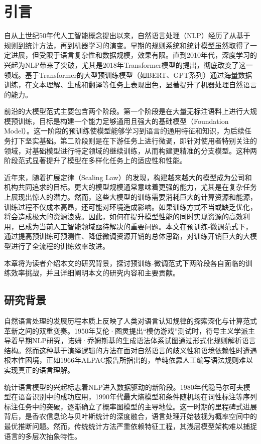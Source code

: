 
\chapter{引言}

自从上世纪50年代人工智能概念提出以来，自然语言处理（NLP）经历了从基于规则到统计方法，再到机器学习的演变。早期的规则系统和统计模型虽然取得了一定进展，但受限于语言复杂性和数据规模，效果有限。直到2010年代，深度学习的兴起为NLP带来了突破，尤其是2018年Transformer模型的提出，彻底改变了这一领域。基于Transformer的大型预训练模型（如BERT、GPT系列）通过海量数据训练，在文本理解、生成和翻译等任务上表现出色，显著提升了机器处理自然语言的能力。


前沿的大模型范式主要包含两个阶段。第一个阶段是在大量无标注语料上进行大规模预训练，目标是构建一个能力足够通用且强大的基础模型（Foundation Model）。这一阶段的预训练使模型能够学习到语言的通用特征和知识，为后续任务打下坚实基础。第二阶段则是在下游任务上进行微调，即针对使用者特别关注的领域，对基础模型进行特定领域的继续训练，从而构建更精准的分支模型。这种两阶段范式显著提升了模型在多样化任务上的适应性和性能。

近年来，随着扩展定律（Scaling Law）的发现，构建越来越大的模型成为公司和机构共同追求的目标。更大的模型规模通常意味着更强的能力，尤其是在复杂任务上展现出惊人的潜力。然而，这些大模型的训练需要消耗巨大的计算资源和能源，训练过程不仅成本高昂，还可能对环境造成影响。如果训练方式不当或缺乏优化，将会造成极大的资源浪费。因此，如何在提升模型性能的同时实现资源的高效利用，已成为当前人工智能领域亟待解决的重要问题。本文在预训练-微调范式下，通过提高预训练可预测性、降低微调资源开销的总体思路，对训练开销巨大的大模型进行了全流程的训练效率改进。

本章将为读者介绍本文的研究背景，探讨预训练-微调范式下两阶段各自面临的训练效率挑战，并且详细阐明本文的研究内容和主要贡献。


\section{研究背景}

自然语言处理的发展历程本质上反映了人类对语言认知规律的探索深化与计算范式革新之间的双重变奏。1950年艾伦·图灵提出“模仿游戏”测试时，符号主义学派主导着早期NLP研究，诺姆·乔姆斯基的生成语法体系试图通过形式化规则解析语言结构。然而这种基于演绎逻辑的方法在面对自然语言的歧义性和语境依赖性时遭遇根本性困境，正如1966年ALPAC报告所指出的，单纯依靠人工编写语法规则难以实现真正的语言理解。

统计语言模型的兴起标志着NLP进入数据驱动的新阶段。1980年代隐马尔可夫模型在语音识别中的成功应用，1990年代最大熵模型和条件随机场在词性标注等序列标注任务中的突破，逐渐确立了概率图模型的主导地位。这一时期的里程碑式进展背后，是香农信息论与贝叶斯统计的深度融合，语言处理开始被视为概率空间中的最优推断问题。然而，传统统计方法严重依赖特征工程，其浅层模型架构难以捕捉语言的多层次抽象特性。

